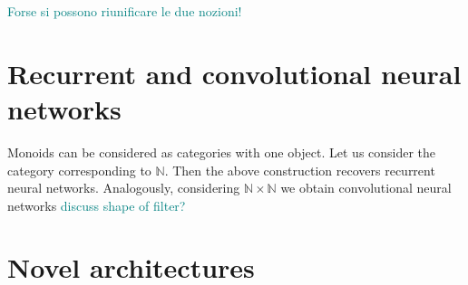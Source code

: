 \documentclass[12pt]{article}
\newcommand{\pietro}[1]{\textcolor{teal}{#1}}
\newcommand{\N}{{\mathbb{N}}}
\begin{document}
\pietro{Forse si possono riunificare le due nozioni!}

\section{Recurrent and convolutional neural networks}

Monoids can be considered as categories with one object. Let us consider the category corresponding to $\N$. Then the above construction recovers recurrent neural networks. Analogously, considering $\N \times \N$ we obtain convolutional neural networks \pietro{discuss shape of filter?}

\section{Novel architectures}



\end{document}
